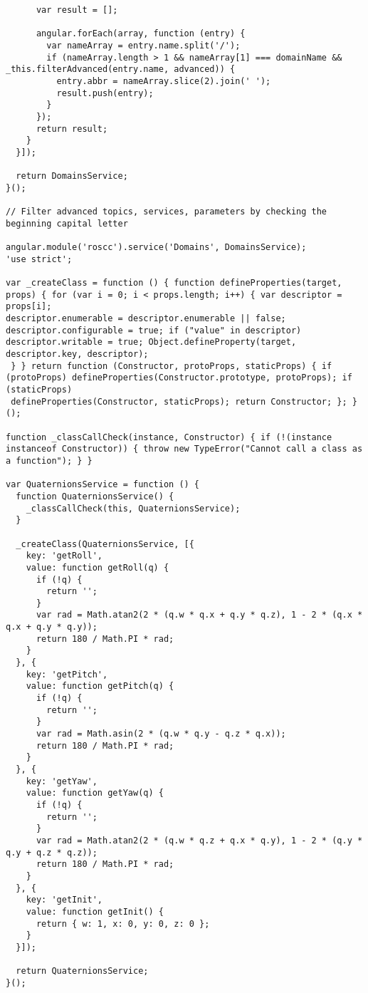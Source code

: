 \begin{verbatim}
      var result = [];

      angular.forEach(array, function (entry) {
        var nameArray = entry.name.split('/');
        if (nameArray.length > 1 && nameArray[1] === domainName && _this.filterAdvanced(entry.name, advanced)) {
          entry.abbr = nameArray.slice(2).join(' ');
          result.push(entry);
        }
      });
      return result;
    }
  }]);

  return DomainsService;
}();

// Filter advanced topics, services, parameters by checking the beginning capital letter

angular.module('roscc').service('Domains', DomainsService);
'use strict';

var _createClass = function () { function defineProperties(target, props) { for (var i = 0; i < props.length; i++) { var descriptor = props[i]; 
descriptor.enumerable = descriptor.enumerable || false; descriptor.configurable = true; if ("value" in descriptor) 
descriptor.writable = true; Object.defineProperty(target, descriptor.key, descriptor);
 } } return function (Constructor, protoProps, staticProps) { if (protoProps) defineProperties(Constructor.prototype, protoProps); if (staticProps) 
 defineProperties(Constructor, staticProps); return Constructor; }; }();

function _classCallCheck(instance, Constructor) { if (!(instance instanceof Constructor)) { throw new TypeError("Cannot call a class as a function"); } }

var QuaternionsService = function () {
  function QuaternionsService() {
    _classCallCheck(this, QuaternionsService);
  }

  _createClass(QuaternionsService, [{
    key: 'getRoll',
    value: function getRoll(q) {
      if (!q) {
        return '';
      }
      var rad = Math.atan2(2 * (q.w * q.x + q.y * q.z), 1 - 2 * (q.x * q.x + q.y * q.y));
      return 180 / Math.PI * rad;
    }
  }, {
    key: 'getPitch',
    value: function getPitch(q) {
      if (!q) {
        return '';
      }
      var rad = Math.asin(2 * (q.w * q.y - q.z * q.x));
      return 180 / Math.PI * rad;
    }
  }, {
    key: 'getYaw',
    value: function getYaw(q) {
      if (!q) {
        return '';
      }
      var rad = Math.atan2(2 * (q.w * q.z + q.x * q.y), 1 - 2 * (q.y * q.y + q.z * q.z));
      return 180 / Math.PI * rad;
    }
  }, {
    key: 'getInit',
    value: function getInit() {
      return { w: 1, x: 0, y: 0, z: 0 };
    }
  }]);

  return QuaternionsService;
}();


\end{verbatim}
